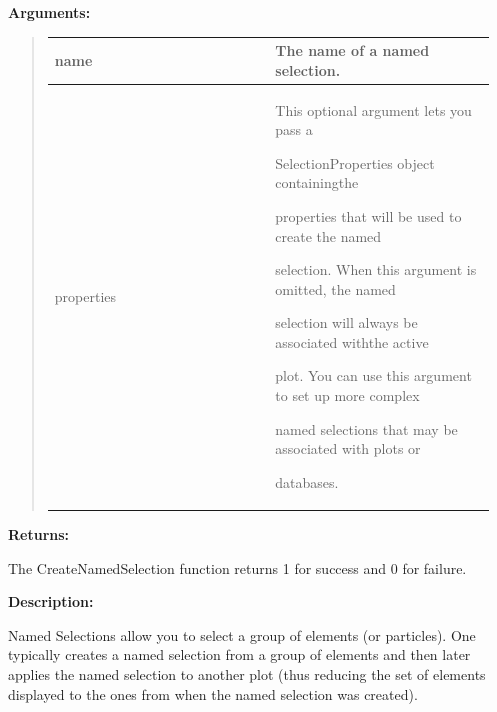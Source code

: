 \documentclass[letterpaper,10pt,english]{sphinxmanual}
\begin{document}
\begin{DUlineblock}{0em}
\item[] 
\item[] \textbf{Arguments:}
\end{DUlineblock}
\begin{quote}

\begin{tabular}{|p{0.475\linewidth}|p{0.475\linewidth}|}
\hline

name
 & 
The name of a named selection.
\\
\hline
properties
 & 
\begin{DUlineblock}{0em}
\item[] This optional argument lets you pass a
\item[] SelectionProperties object containingthe
\item[] properties that will be used to create the named
\item[] selection. When this argument is omitted, the named
\item[] selection will always be associated withthe active
\item[] plot. You can use this argument to set up more complex
\item[] named selections that may be associated with plots or
\item[] databases.
\end{DUlineblock}
\\
\hline\end{tabular}

\end{quote}

\begin{DUlineblock}{0em}
\item[] 
\item[] \textbf{Returns:}
\item[] The CreateNamedSelection function returns 1 for success and 0 for failure.
\item[] 
\item[] \textbf{Description:}
\item[] Named Selections allow you to select a group of elements (or particles).
One typically creates a named selection from a group of elements and then
later applies the named selection to another plot (thus reducing the
set of elements displayed to the ones from when the named selection was
created).
\end{DUlineblock}

\begin{DUlineblock}{0em}
\item[] 
\end{DUlineblock}
\end{document}
